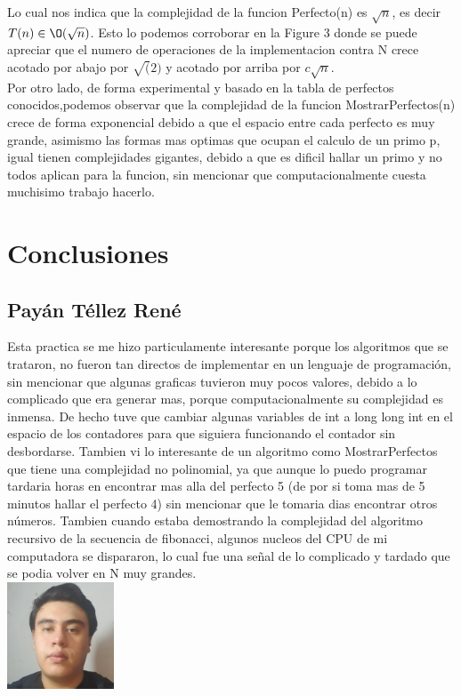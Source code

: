 \documentclass[spanish]{article}
\begin{document}
			Lo cual nos indica que la complejidad de la funcion Perfecto(n) es $\sqrt{n}$, es decir $T(n)\in\O(\sqrt{n})$. Esto lo podemos corroborar en la Figure 3 donde se puede apreciar que el numero de operaciones de la implementacion contra N crece acotado por abajo por $\sqrt(2)$ y acotado por arriba por $c\sqrt{n}$.\\			
			Por otro lado, de forma experimental y basado en la tabla de perfectos conocidos,podemos observar que la complejidad de la funcion MostrarPerfectos(n) crece de forma exponencial debido a que el espacio entre cada perfecto es muy grande, asimismo las formas mas optimas que ocupan el calculo de un primo p, igual tienen complejidades gigantes, debido a que es dificil hallar un primo y no todos aplican para la funcion, sin mencionar que computacionalmente cuesta muchisimo trabajo hacerlo.
			
		\section{Conclusiones}			
			\subsection{Payán Téllez René}
			Esta practica se me hizo particulamente interesante porque los algoritmos que se trataron, no fueron tan directos de implementar en un lenguaje de programación, sin mencionar que algunas graficas tuvieron muy pocos valores, debido a lo complicado que era generar mas, porque computacionalmente su complejidad es inmensa. De hecho tuve que cambiar algunas variables de int a long long int en el espacio de los contadores para que siguiera funcionando el contador sin desbordarse. Tambien vi lo interesante de un algoritmo como MostrarPerfectos que tiene una complejidad no polinomial, ya que aunque lo puedo programar tardaria horas en encontrar mas alla del perfecto 5 (de por si toma mas de 5 minutos hallar el perfecto 4) sin mencionar que le tomaria dias encontrar otros números. Tambien cuando estaba demostrando la complejidad del algoritmo recursivo de la secuencia de fibonacci, algunos nucleos del CPU de mi computadora se dispararon, lo cual fue una señal de lo complicado y tardado que se podia volver en N muy grandes.\\
			\includegraphics[height=120px,width=120px]{Rene}
\end{document}
